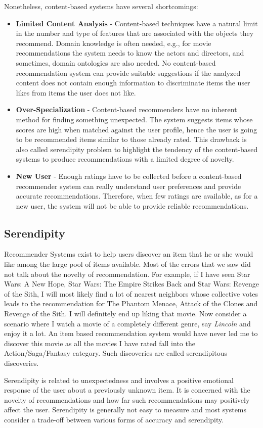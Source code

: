 Nonetheless, content-based systems have several shortcomings:
\begin{itemize}
\item \textbf{Limited Content Analysis} - Content-based techniques have a natural limit in the number and type of features that are associated with the objects they recommend. Domain knowledge is often needed, e.g., for movie recommendations the system needs to know the actors and directors, and sometimes, domain ontologies are also needed. No content-based recommendation system can provide suitable suggestions if the analyzed content does not contain enough information to discriminate items the user likes from items the user does not like.
\end{itemize}
\begin{itemize}
\item \textbf{Over-Specialization} - Content-based recommenders have no inherent method for finding something unexpected. The system suggests items whose scores are high when matched against the user profile, hence the user is going to be recommended items similar to those already rated. This drawback is also called serendipity problem to highlight the tendency of the content-based systems to produce recommendations with a limited degree of novelty.
\end{itemize}
\begin{itemize}
\item \textbf{New User} - Enough ratings have to be collected before a content-based recommender system can really understand user preferences and provide accurate recommendations. Therefore, when few ratings are available, as for a new user, the system will not be able to provide reliable recommendations.
\end{itemize}

  \subsection{Serendipity}
  Recommender Systems exist to help users discover an item that he or she would like among the large pool of items available. Most of the errors that we saw did not talk about the novelty of recommendation. For example, if I have seen Star Wars: A New Hope, Star Wars: The Empire Strikes Back and Star Wars: Revenge of the Sith, I will most likely find a lot of nearest neighbors whose collective votes leads to the recommendation for The Phantom Menace, Attack of the Clones and Revenge of the Sith. I will definitely end up liking that movie. Now consider a scenario where I watch a movie of a completely different genre, say \textit{Lincoln} and enjoy it a lot. An item based recommendation system would have never led me to discover this movie as all the movies I have rated fall into the Action/Saga/Fantasy category. Such discoveries are called serendipitous discoveries. 

Serendipity is related to unexpectedness and involves a positive emotional response of the user about a previously unknown item. It is concerned with the novelty of recommendations and how far such recommendations may positively affect the user. Serendipity is generally not easy to measure and most systems consider a trade-off between various forms of accuracy and serendipity. 
% 
